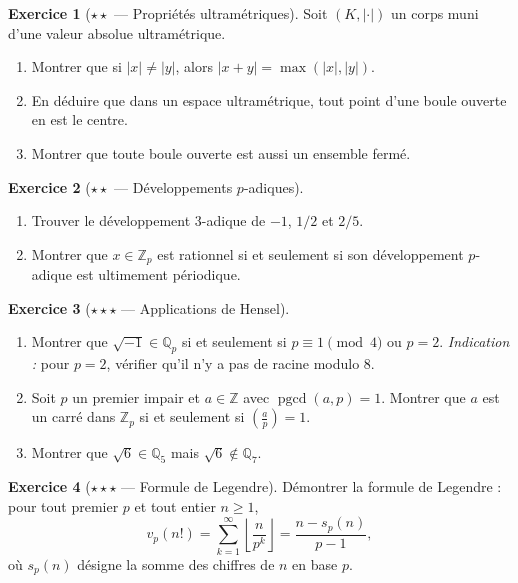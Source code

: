 \documentclass[12pt,a4paper,openany]{book}
\theoremstyle{definition}
\newtheorem{exercice}{Exercice}[chapter]
\theoremstyle{plain}
\theoremstyle{remark}
\newcommand{\Z}{\mathbb{Z}}
\newcommand{\Q}{\mathbb{Q}}
\newcommand{\abs}[1]{\left|#1\right|}
\newcommand{\floor}[1]{\left\lfloor #1 \right\rfloor}
\newcommand{\legendre}[2]{\left(\frac{#1}{#2}\right)}
\DeclareMathOperator{\pgcd}{pgcd}
\begin{document}
\begin{exercice}[$\star\star$ --- Propriétés ultramétriques]
\label{exo:proprietes-ultrametriques}
Soit $(K, \abs{\cdot})$ un corps muni d'une valeur absolue ultramétrique.
\begin{enumerate}[label=(\alph*)]
  \item Montrer que si $\abs{x} \neq \abs{y}$, alors $\abs{x+y} = \max(\abs{x}, \abs{y})$.
  \item En déduire que dans un espace ultramétrique, tout point d'une boule ouverte
    en est le centre.
  \item Montrer que toute boule ouverte est aussi un ensemble fermé.
\end{enumerate}
\end{exercice}

\begin{exercice}[$\star\star$ --- Développements $p$-adiques]
\label{exo:developpements-p-adiques}
\begin{enumerate}[label=(\alph*)]
  \item Trouver le développement $3$-adique de $-1$, $1/2$ et $2/5$.
  \item Montrer que $x \in \Z_p$ est rationnel si et seulement si son développement
    $p$-adique est ultimement périodique.
\end{enumerate}
\end{exercice}

\begin{exercice}[$\star\star\star$ --- Applications de Hensel]
\label{exo:applications-hensel}
\begin{enumerate}[label=(\alph*)]
  \item Montrer que $\sqrt{-1} \in \Q_p$ si et seulement si $p \equiv 1 \pmod{4}$ ou $p = 2$.
    \textit{Indication :} pour $p=2$, vérifier qu'il n'y a pas de racine modulo $8$.
  \item Soit $p$ un premier impair et $a \in \Z$ avec $\pgcd(a,p) = 1$. Montrer que
    $a$ est un carré dans $\Z_p$ si et seulement si $\legendre{a}{p} = 1$.
  \item Montrer que $\sqrt{6} \in \Q_5$ mais $\sqrt{6} \notin \Q_7$.
\end{enumerate}
\end{exercice}

\begin{exercice}[$\star\star\star$ --- Formule de Legendre]
\label{exo:formule-legendre}
Démontrer la formule de Legendre : pour tout premier $p$ et tout entier $n \geq 1$,
\[
  v_p(n!) = \sum_{k=1}^{\infty} \floor{\frac{n}{p^k}}
  = \frac{n - s_p(n)}{p - 1},
\]
où $s_p(n)$ désigne la somme des chiffres de $n$ en base $p$.
\end{exercice}
\end{document}
